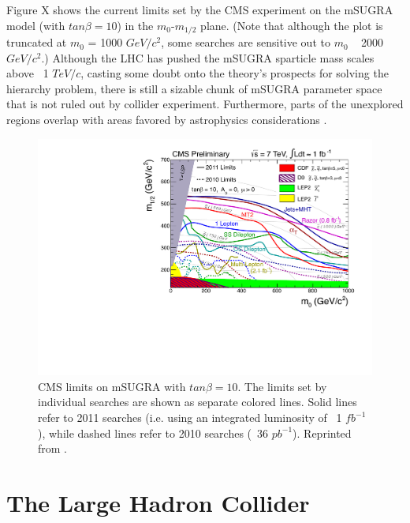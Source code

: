 \documentclass[12pt, letterpaper]{report}
\begin{document}
Figure X shows the current limits set by the CMS experiment on the mSUGRA model (with $tan \beta = 10$) in the $m_{0}$-$m_{1/2}$ plane.  (Note that although the plot is truncated at $m_{0}$ = 1000 $GeV/c^{2}$, some searches are sensitive out to $m_{0}$ ~ 2000 $GeV/c^{2}$.)  Although the LHC has pushed the mSUGRA sparticle mass scales above ~1 $TeV/c$, casting some doubt onto the theory's prospects for solving the hierarchy problem, there is still a sizable chunk of mSUGRA parameter space that is not ruled out by collider experiment.  Furthermore, parts of the unexplored regions overlap with areas favored by astrophysics considerations \cite{papers_that_say_all_that_eg_SUSY11}.



\begin{figure}
	\centering
	\includegraphics[scale=0.7]{CMS_SUSY_2011Limits_tanb10}
	\caption{CMS limits on mSUGRA with $tan \beta = 10$.  The limits set by individual searches are shown as separate colored lines.  Solid lines refer to 2011 searches (i.e. using an integrated luminosity of ~1 $fb^{-1}$), while dashed lines refer to 2010 searches (~36 $pb^{-1}$).  Reprinted from \cite{CMS_mSUGRA}.}
\end{figure}

\chapter{The Large Hadron Collider}
\end{document}
